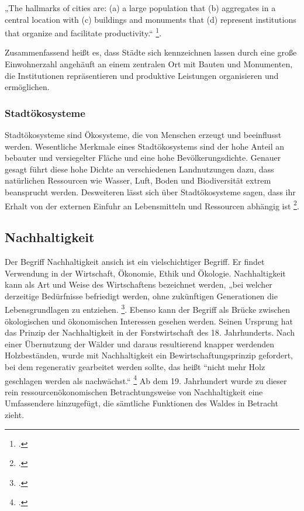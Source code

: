 \documentclass{scrartcl}
\begin{document}
\begin{displayquote} 
„The hallmarks of cities are: (a) a large population that (b) aggregates in a central location with (c) buildings and monuments that (d) represent institutions that organize and facilitate productivity.“ \footcite[S.16]{Elmqvist2013}. 
\end{displayquote}  Zusammenfassend heißt es, dass Städte sich kennzeichnen lassen durch eine große Einwohnerzahl angehäuft an einem zentralen Ort mit Bauten und Monumenten, die Institutionen repräsentieren und produktive Leistungen organisieren und ermöglichen.

\subsubsection{Stadtökosysteme}
Stadtökosysteme sind Ökosysteme, die von Menschen erzeugt und beeinflusst werden. Wesentliche Merkmale eines Stadtökosystems sind der hohe Anteil an bebauter und versiegelter Fläche und eine hohe Bevölkerungsdichte. Genauer gesagt führt diese hohe Dichte an verschiedenen Landnutzungen dazu, dass natürlichen Ressourcen wie Wasser, Luft, Boden und Biodiversität extrem beansprucht werden. Desweiteren lässt sich über Stadtökosysteme sagen, dass ihr Erhalt von der externen Einfuhr an Lebensmitteln und Ressourcen abhängig ist  \footcite[S.61]{Breuste2016Stadtokosysteme}.


\subsection{Nachhaltigkeit}

Der Begriff Nachhaltigkeit ansich ist ein vielschichtiger Begriff. Er findet Verwendung in der Wirtschaft, Ökonomie, Ethik und Ökologie. Nachhaltigkeit kann als Art und Weise des Wirtschaftens bezeichnet werden, „bei welcher derzeitige Bedürfnisse befriedigt werden, ohne zukünftigen Generationen die Lebensgrundlagen zu entziehen. \footcite{DefinitionWirtschaftslexikonb}. Ebenso kann der Begriff als Brücke zwischen ökologischen und ökonomischen Interessen gesehen werden. Seinen Ursprung hat das Prinzip der Nachhaltigkeit in der Forstwirtschaft des 18. Jahrhunderts. Nach einer Übernutzung der Wälder und daraus resultierend knapper werdenden Holzbeständen, wurde mit Nachhaltigkeit ein Bewirtschaftungsprinzip gefordert, bei dem regenerativ gearbeitet werden sollte, das heißt “nicht mehr Holz geschlagen werden als nachwächst.“ \footcite{NachhaltigeBrockhaus.de}
Ab dem 19. Jahrhundert wurde zu dieser rein ressourcenökonomischen Betrachtungsweise von Nachhaltigkeit eine Umfassendere hinzugefügt, die sämtliche Funktionen des Waldes in Betracht zieht.
\end{document}
